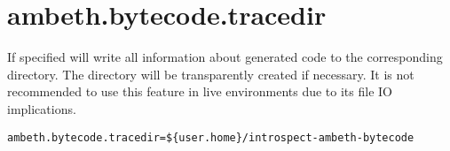 \section{ambeth.bytecode.tracedir}
\label{configuration:AmbethBytecodeTracedir}
\ClearAPI
If specified \AMBETH{} will write all information about generated code to the corresponding directory. The directory will be transparently created if necessary. It is not recommended to use this feature in live environments due to its file IO implications.

\begin{lstlisting}[style=Props,caption={Usage example for \textit{ambeth.bytecode.tracedir}}]
ambeth.bytecode.tracedir=${user.home}/introspect-ambeth-bytecode
\end{lstlisting}


